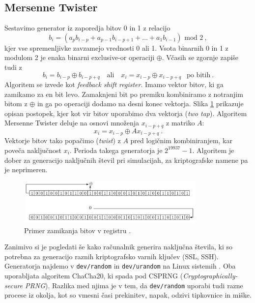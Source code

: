 \documentclass[11pt, oneside]{article}
\theoremstyle{definition}
\begin{document}
\subsection{Mersenne Twister}
Sestavimo generator iz zaporedja bitov 0 in 1 z relacijo
\begin{equation}
    b_i = (a_p b_{i-p} + a_{p-1}b_{i-p+1} + \ldots + a_1 b_{i-1}) \text{ mod } 2 \>,
\end{equation}
kjer vse spremenljivke zavzamejo vrednosti 0 ali 1.
Vsota binarnih 0 in 1 z modulom 2 je enaka binarni exclusive-or operaciji $\oplus$.
Včasih se zgornje zapiše tudi z
\begin{equation}
    b_i = b_{i-p} \oplus b_{i-p+q} \quad \text{ali} \quad x_i = x_{i-p} \oplus x_{i-p+q} \>\> \text{ po bitih} \>.
\end{equation}
Algoritem se izvede kot \emph{feedback shift register}. Imamo vektor bitov, ki ga zamikamo za en bit levo. Zamaknjeni
bit po premiku kombiniramo z notranjim bitom z $\oplus$ in ga po operaciji dodamo na desni konec vektorja.
Slika \ref{fig: twotap} prikazuje opisan postopek, kjer kot vir bitov uporabimo dva vektorja (\emph{two tap}).
Algoritem Mersenne Twister deluje na osnovi množenja $x_{i-p+q}$ z matriko $A$:
\begin{equation}
    x_i = x_{i-p} \oplus A x_{i-p+q} \>.
\end{equation}
Vektorje bitov tako popačimo (\emph{twist}) z $A$ pred logičnim kombiniranjem, kar poveča naključnost $x_i$.
Perioda takega generatorja je $2^{19937}-1$. Algoritem je dober za generacijo naključnih števil
pri simulacijah, za kriptografske namene pa je neprimeren.

\newpage

\begin{figure}[h!]
    \centering
    \includegraphics[width=0.82\textwidth]{two_tap.png}
    \caption{Primer zamikanja bitov v registru \cite{gentle2003random}.}
    \label{fig: twotap}
\end{figure}

Zanimivo si je pogledati še kako računalnik generira naključna števila, ki so potrebna za generacijo
raznih kriptografsko varnih ključev (SSL, SSH). Generatorja najdemo v \texttt{dev/random} in \texttt{dev/urandom}
na Linux sistemih \cite{arch}. Oba uporabljata algoritem ChaCha20, ki spada pod CSPRNG
(\emph{Cryptographically-secure PRNG}).
Razlika med njima je v tem, da \texttt{dev/random} uporabi tudi razne procese iz okolja, kot so vmesni časi
prekinitev, napak, odzivi tipkovnice in miške.
\end{document}
